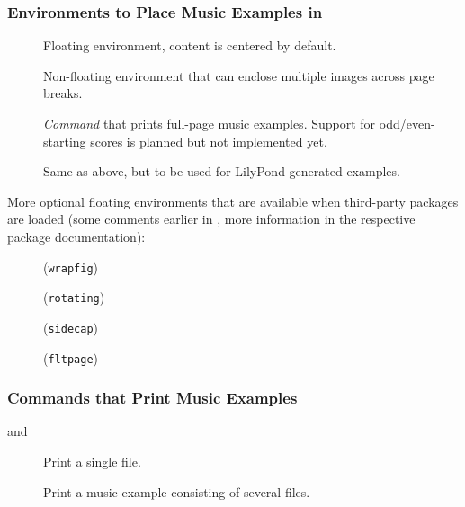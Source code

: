 \documentclass[../openLilyLib]{subfiles}
\begin{document}
\subsubsection*{Environments to Place Music Examples in}
\begin{description}
\item[] Floating environment, content is centered by default.
\item[] Non-floating environment that can enclose multiple images across page breaks.
\item[] \emph{Command} that prints full-page music examples.
Support for odd/even-starting scores is planned but not implemented yet.
\item[] Same as above, but to be used for LilyPond generated examples.
\end{description}

More optional floating environments that are available when third-party packages are loaded (some comments earlier in , more information in the respective package documentation):
\begin{description}
\item[](\texttt{wrapfig})
\item[] (\texttt{rotating})
\item[] (\texttt{sidecap})
\item[{}] (\texttt{fltpage})
\end{description}

\subsubsection*{Commands that Print Music Examples}
\begin{description}
\item[ and ]Print a single file.
\item[]Print a music example consisting of several files.
\end{description}
\end{document}
